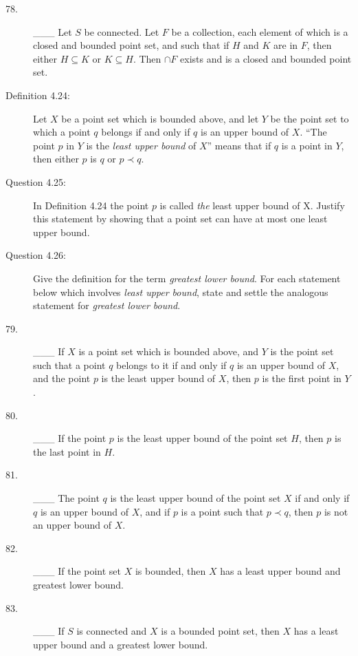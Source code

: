 \documentclass{book}
\begin{document}
\begin{description}
\item[78.] \_\_\_ Let $S$ be connected. Let $F$ be a collection, each element of which is a closed and bounded point set, and such that if $H$ and $K$ are in $F$, then either $H \subseteq K$ or $K \subseteq H$. Then $\cap F$ exists and is a closed and bounded point set.

\item[Definition 4.24:] Let $X$ be a point set which is bounded above, and let $Y$ be the point set to which a point $q$ belongs if and only if $q$ is an upper bound of $X$. ``The point $p$ in $Y$ is the \emph{least upper bound} of $X$'' means that if $q$ is a point in $Y$, then either $p$ is $q$ or $p \prec q$.

\item[Question 4.25:] In Definition 4.24 the point $p$ is called \emph{the} least upper bound of X. Justify this statement by showing that a point set can have at most one least upper bound.

\item[Question 4.26:] Give the definition for the term \emph{greatest lower bound}. For each statement below which involves \emph{least upper bound}, state and settle the analogous statement for \emph{greatest lower bound}.

\item[79.] \_\_\_ If $X$ is a point set which is bounded above, and $Y$ is the point set such that a point $q$ belongs to it if and only if $q$ is an upper bound of $X$, and the point $p$ is the least upper bound of $X$, then $p$ is the first point in $Y$.

\item[80.] \_\_\_ If the point $p$ is the least upper bound of the point set $H$, then $p$ is the last point in $H$.

\item[81.] \_\_\_ The point $q$ is the least upper bound of the point set $X$ if and only if $q$ is an upper bound of $X$, and if $p$ is a point such that $p \prec q$, then $p$ is not an upper bound of $X$.

\item[82.] \_\_\_ If the point set $X$ is bounded, then $X$ has a least upper bound and greatest lower bound.

\item[83.] \_\_\_ If $S$ is connected and $X$ is a bounded point set, then $X$ has a least upper bound and a greatest lower bound.


\end{description}
\end{document}
